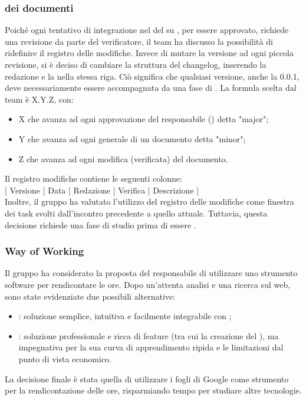 \subsubsection{ dei documenti} \label{sec:versionamento}
Poiché ogni tentativo di integrazione nel  del  su , per essere approvato, richiede una revisione da parte del verificatore, il team ha discusso la possibilità di ridefinire il registro delle modifiche. Invece di mutare la versione ad ogni piccola revisione, si è deciso di cambiare la struttura del changelog, inserendo la redazione e la  nella stessa riga. Ciò significa che qualsiasi versione, anche la 0.0.1, deve necessariamente essere accompagnata da una fase di . La formula scelta dal team è X.Y.Z, con:
\begin{itemize}
	\item X che avanza ad ogni approvazione del responsabile () detta "major";
	\item Y che avanza ad ogni  generale di un documento detta "minor";
	\item Z che avanza ad ogni modifica (verificata) del documento.
\end{itemize}

\vspace{0.5\baselineskip}
Il registro modifiche contiene le seguenti colonne: \\
\vspace{\baselineskip}
\hspace{1cm} | Versione | Data | Redazione | Verifica | Descrizione | \\
Inoltre, il gruppo ha valutato l'utilizzo del registro delle modifiche come finestra dei task svolti dall'incontro precedente a quello attuale. Tuttavia, questa decisione richiede una fase di studio prima di essere .

\subsubsection{Way of Working}
Il gruppo ha considerato la proposta del responsabile di utilizzare uno strumento software per rendicontare le ore. Dopo un'attenta analisi e una ricerca sul web, sono state evidenziate due possibili alternative:
\begin{itemize}
	\item {}: soluzione semplice, intuitiva e facilmente integrabile con ;
	\item {}: soluzione professionale e ricca di feature (tra cui la creazione del ), ma impegnativa per la sua curva di apprendimento ripida e le limitazioni dal punto di vista economico.
\end{itemize}
La decisione finale è stata quella di utilizzare i fogli di Google come strumento per la rendicontazione delle ore, risparmiando tempo per studiare altre tecnologie. 


